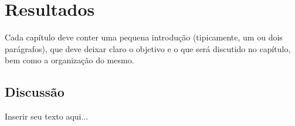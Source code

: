 
\chapter{Resultados}

Cada capítulo deve conter uma pequena introdução (tipicamente, um ou dois parágrafos), que deve deixar claro o objetivo e o que será discutido no capítulo, bem como a organização do mesmo.

\section{Discussão}
\label{sec_discussao_resultados}

Inserir seu texto aqui...
